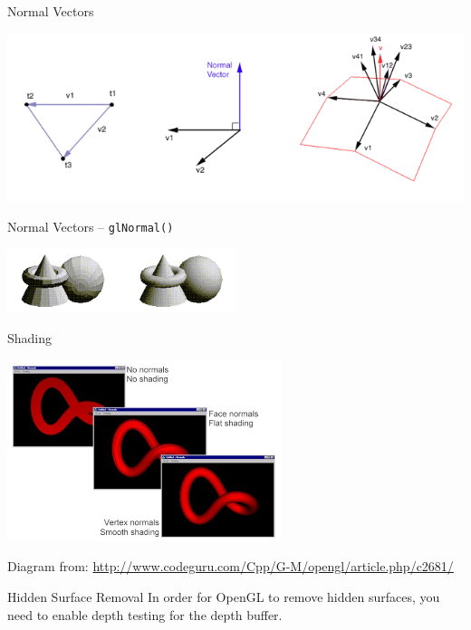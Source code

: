 \documentclass[aspectratio=1610,xcolor=dvipsnames,t]{beamer}
\newcommand{\showcode}[1]{\begin{mdframed}[style=code] %
                          \end{mdframed}%
}
\begin{document}
\begin{frame}{Normal Vectors}
    \begin{center}
        \includegraphics[width=\textwidth]{normalvectors} 
    \end{center}
\end{frame}

\begin{frame}{Normal Vectors -- \texttt{glNormal()}} 
    \showcode{normals.c} 
    \begin{center}
        \includegraphics[width=0.5\textwidth]{smooth-vs-flat} 
    \end{center} 
\end{frame} 


\begin{frame}{Shading} 
    \begin{center}
        \includegraphics[width=0.6\textwidth]{shading} 
    \end{center}
    \tiny
    Diagram from:
    \url{http://www.codeguru.com/Cpp/G-M/opengl/article.php/c2681/} 
    \normalsize
\end{frame} 

\begin{frame}{Hidden Surface Removal} 
    In order for OpenGL to remove hidden surfaces, 
    you need to enable depth testing for the depth buffer.
    \showcode{hidden.c} 
\end{frame} 
\end{document}
